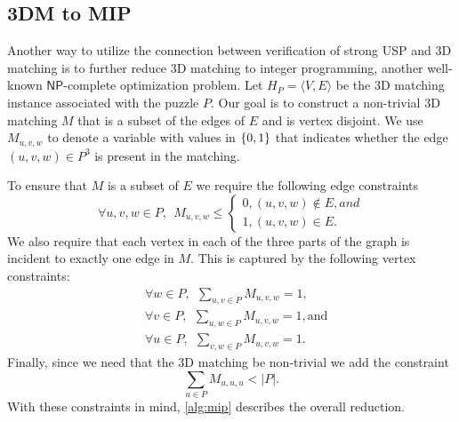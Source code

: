 \documentclass[11pt]{article}
\renewcommand\NP{\ensuremath{\mathsf{NP}}}
\begin{document}



 
\subsection{3DM to MIP}

Another way to utilize the connection between verification of strong
USP and 3D matching is to further reduce 3D matching to integer
programming, another well-known \NP{}-complete optimization problem.
Let $H_P = \langle V, E \rangle$ be the 3D matching instance
associated with the puzzle $P$.  Our goal is to construct a
non-trivial 3D matching $M$ that is a subset of the edges of $E$ and
is vertex disjoint.  We use $M_{u,v,w}$ to denote a variable with
values in $\left\{ 0,1 \right\}$ that indicates whether the edge $(u,v,w) \in
P^3$ is present in the matching.

To ensure that $M$ is a subset of $E$ we require the following edge constraints
\begin{equation}
  \forall u,v,w \in P,~~M_{u,v,w} \le \begin{cases} 0, (u,v,w) \not\in
    E, and \\ 1, (u,v,w) \in E.\end{cases} \label{eqn:cons1}
\end{equation} We also require that each vertex in
each of the three parts of the graph is incident to exactly one edge
in $M$.  This is captured by the following vertex constraints:
\begin{equation}
  \label{eqn:cons2}
\begin{aligned}
&\forall w \in P,~~\sum_{u,v \in P} M_{u,v,w} = 1,\\
&\forall v \in P,~~\sum_{u,w \in P} M_{u,v,w} = 1,\text{and} \\
&\forall u \in P,~~\sum_{v,w \in P} M_{u,v,w} = 1.
\end{aligned}
\end{equation}
Finally, since we need that the 3D matching be non-trivial we
add the constraint
\begin{equation}
  \label{eqn:cons3}
  \sum_{u \in P} M_{u,u,u} < |P|.
\end{equation}
With these constraints in mind, \autoref{alg:mip} describes the
overall reduction.
\end{document}
